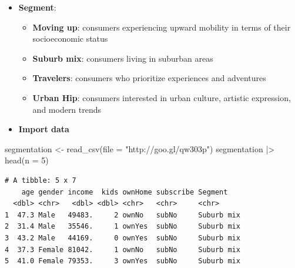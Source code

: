 \documentclass[
  ignorenonframetext,
]{beamer}
\newenvironment{Shaded}{\begin{snugshade}}{\end{snugshade}}
\newcommand{\AttributeTok}[1]{\textcolor[rgb]{0.40,0.45,0.13}{#1}}
\newcommand{\DecValTok}[1]{\textcolor[rgb]{0.68,0.00,0.00}{#1}}
\newcommand{\FunctionTok}[1]{\textcolor[rgb]{0.28,0.35,0.67}{#1}}
\newcommand{\NormalTok}[1]{\textcolor[rgb]{0.00,0.23,0.31}{#1}}
\newcommand{\OtherTok}[1]{\textcolor[rgb]{0.00,0.23,0.31}{#1}}
\newcommand{\SpecialCharTok}[1]{\textcolor[rgb]{0.37,0.37,0.37}{#1}}
\newcommand{\StringTok}[1]{\textcolor[rgb]{0.13,0.47,0.30}{#1}}
\providecommand{\tightlist}{%
  \setlength{\itemsep}{0pt}\setlength{\parskip}{0pt}}\usepackage{longtable,booktabs,array}
\begin{document}
\begin{frame}{}
\label{section-3}
\begin{itemize}
\item
  \textbf{Segment}:

  \begin{itemize}
  \tightlist
  \item
    \textbf{Moving up}: consumers experiencing upward mobility in terms
    of their socioeconomic status
  \item
    \textbf{Suburb mix}: consumers living in suburban areas
  \item
    \textbf{Travelers}: consumers who prioritize experiences and
    adventures
  \item
    \textbf{Urban Hip}: consumers interested in urban culture, artistic
    expression, and modern trends
  \end{itemize}
\end{itemize}
\end{frame}

\begin{frame}[fragile]{}
\label{section-4}
\begin{itemize}
\tightlist
\item
  \textbf{Import data}
\end{itemize}

\tiny

\begin{Shaded}
\begin{Highlighting}[]
\NormalTok{segmentation }\OtherTok{\textless{}{-}} \FunctionTok{read\_csv}\NormalTok{(}\AttributeTok{file =} \StringTok{"http://goo.gl/qw303p"}\NormalTok{)}
\NormalTok{segmentation }\SpecialCharTok{|\textgreater{}} \FunctionTok{head}\NormalTok{(}\AttributeTok{n =} \DecValTok{5}\NormalTok{)}
\end{Highlighting}
\end{Shaded}

\begin{verbatim}
# A tibble: 5 x 7
    age gender income  kids ownHome subscribe Segment   
  <dbl> <chr>   <dbl> <dbl> <chr>   <chr>     <chr>     
1  47.3 Male   49483.     2 ownNo   subNo     Suburb mix
2  31.4 Male   35546.     1 ownYes  subNo     Suburb mix
3  43.2 Male   44169.     0 ownYes  subNo     Suburb mix
4  37.3 Female 81042.     1 ownNo   subNo     Suburb mix
5  41.0 Female 79353.     3 ownYes  subNo     Suburb mix
\end{verbatim}
\end{frame}
\end{document}
